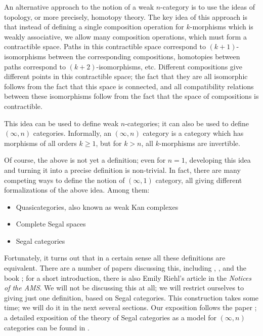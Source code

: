 An alternative approach to the notion of a weak $n$-category is to use the
ideas of topology, or more precisely, homotopy theory. The key idea of this
approach is that instead of defining a single composition operation for
$k$-morphisms which is weakly associative, we allow many composition
operations, which must form a contractible space. Paths in this contractible
space correspond to $(k+1)$-isomorphisms between the corresponding
compositions, homotopies between paths correspond to $(k+2)$-isomorphisms, etc.
Different compositions give different points in this contractible space; the
fact that they are all isomorphic follows from the fact that this space is
connected, and all compatibility relations between these isomorphisms follow
from the fact that the space of compositions is contractible.

This idea can be used to define weak $n$-categories; it can also be used to
define $(\infty, n)$ categories. Informally, an $(\infty, n)$ category is a
category which has morphisms of all orders $k \ge 1$, but for $k>n$, all
$k$-morphisms are invertible.


Of course, the above is not yet a definition; even for $n=1$, developing this
idea and turning it into a precise definition is non-trivial. In fact, there are
many competing ways to define the notion of $(\infty, 1)$ category, all giving
different formalizations of the above idea. Among them:

\begin{itemize}
  \item Quasicategories, also known as weak Kan complexes
  \item Complete Segal spaces
  \item Segal categories
\end{itemize}

Fortunately, it turns out that in a certain sense all these definitions are
equivalent. There are a number of papers discussing this, including
, , and the book ; for a short
introduction, there is also Emily Riehl's article  in the
\emph{Notices of the AMS}. We will not be discussing this at all; we will
restrict ourselves to giving just one definition, based on Segal categories.
This construction takes some time; we will do it in the next several sections.
Our exposition follows the paper ; a detailed
exposition of the theory of Segal categories as a model for $(\infty, n)$
categories can be found in .



